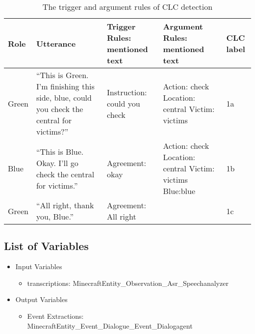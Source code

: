 \begin{table*}[tb]
\centering
\begin{tabular}{lp{1in}lll}
    \toprule
    Role & Utterance & Trigger Rules: mentioned text & Argument Rules: mentioned text & CLC label \\\midrule
   Green & “This is Green. I’m finishing this side, blue, could you check the central for victims?” & Instruction: could you check & Action: check \newline Location: central \newline Victim: victims & 1a\\
   Blue & “This is Blue. Okay. I’ll go check the central for victims.” & Agreement: okay & Action: check \newline Location: central \newline Victim: victims \newline Blue:blue & 1b\\
   Green & “All right, thank you, Blue.” & Agreement: All right &  & 1c\\
    \bottomrule
\end{tabular}
\caption{The trigger and argument rules of CLC detection}
\label{tab:clc-triggers-labels}
\end{table*}
\subsection{List of Variables}
\begin{itemize}
    \item Input Variables
    \begin{itemize}
        \item transcriptions: MinecraftEntity\_Observation\_Asr\_Speechanalyzer
    \end{itemize}
    \item Output Variables
    \begin{itemize}
        \item Event Extractions: MinecraftEntity\_Event\_Dialogue\_Event\_Dialogagent
    \end{itemize}
\end{itemize}

\usepackage{algorithm}
\usepackage{algpseudocode}

